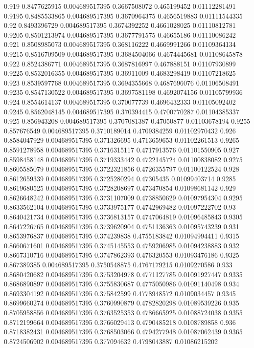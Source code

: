 {0.919 0.8477625915 0.004689517395 0.3667508072 0.465199452 0.01112281491
0.9195 0.8485533865 0.004689517395 0.3670964375 0.4656519883 0.01111544335
0.92 0.8493396729 0.004689517395 0.3674392252 0.4661028025 0.01110812781
0.9205 0.8501213974 0.004689517395 0.3677791575 0.46655186 0.01110086242
0.921 0.8508985073 0.004689517395 0.368116222 0.4669991266 0.01109364134
0.9215 0.8516709509 0.004689517395 0.3684504066 0.4674445681 0.01108645878
0.922 0.8524386771 0.004689517395 0.3687816997 0.467888151 0.01107930899
0.9225 0.8532016355 0.004689517395 0.36911009 0.4683298419 0.01107218625
0.923 0.8539597768 0.004689517395 0.3694355668 0.4687696076 0.01106508491
0.9235 0.8547130522 0.004689517395 0.3697581198 0.4692074156 0.01105799936
0.924 0.8554614137 0.004689517395 0.370077739 0.4696432333 0.01105092402
0.9245 0.8562048145 0.004689517395 0.370394415 0.4700770287 0.01104385337
0.925 0.856943208 0.004689517395 0.3707081387 0.47050877 0.01103678194
0.9255 0.857676549 0.004689517395 0.3710189014 0.4709384259 0.01102970432
0.926 0.8584047929 0.004689517395 0.371326695 0.4713659653 0.01102261513
0.9265 0.8591278958 0.004689517395 0.3716315117 0.4717913576 0.01101550905
0.927 0.8598458148 0.004689517395 0.3719333442 0.4722145724 0.01100838082
0.9275 0.8605585079 0.004689517395 0.3722321856 0.4726355797 0.01100122524
0.928 0.8612659339 0.004689517395 0.3725280294 0.47305435 0.01099403714
0.9285 0.8619680525 0.004689517395 0.3728208697 0.473470854 0.01098681142
0.929 0.8626648242 0.004689517395 0.3731107009 0.4738850629 0.01097954304
0.9295 0.8633562104 0.004689517395 0.3733975177 0.4742969482 0.01097222702
0.93 0.8640421734 0.004689517395 0.3736813157 0.4747064819 0.01096485843
0.9305 0.8647226765 0.004689517395 0.3739620904 0.4751136363 0.01095743239
0.931 0.8653976837 0.004689517395 0.374239838 0.4755183842 0.01094994411
0.9315 0.8660671601 0.004689517395 0.3745145553 0.4759206985 0.01094238883
0.932 0.8667310716 0.004689517395 0.3747862393 0.476320553 0.01093476186
0.9325 0.867389385 0.004689517395 0.3750548875 0.4767179215 0.0109270586
0.933 0.8680420682 0.004689517395 0.3753204978 0.4771127785 0.01091927447
0.9335 0.8686890897 0.004689517395 0.3755830687 0.4775050986 0.01091140498
0.934 0.8693304192 0.004689517395 0.375842599 0.4778948572 0.0109034457
0.9345 0.8699660274 0.004689517395 0.3760990879 0.4782820298 0.01089539226
0.935 0.8705958856 0.004689517395 0.3763525353 0.4786665925 0.01088724038
0.9355 0.8712199664 0.004689517395 0.3766029413 0.4790485218 0.0108789858
0.936 0.8718382431 0.004689517395 0.3768503066 0.4794277948 0.01087062439
0.9365 0.8724506902 0.004689517395 0.377094632 0.4798043887 0.01086215202
}
